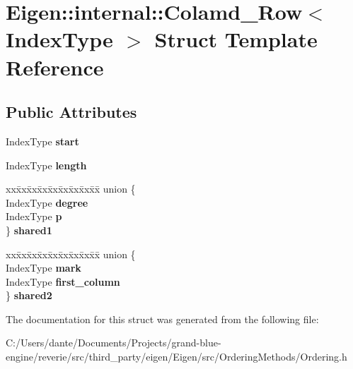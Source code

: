 \hypertarget{struct_eigen_1_1internal_1_1_colamd___row}{}\section{Eigen\+::internal\+::Colamd\+\_\+\+Row$<$ Index\+Type $>$ Struct Template Reference}
\label{struct_eigen_1_1internal_1_1_colamd___row}
\subsection*{Public Attributes}
\begin{DoxyCompactItemize}
\item 
\mbox{\label{struct_eigen_1_1internal_1_1_colamd___row_a41f05e0dd97a417777b381619fedc697}} 
Index\+Type {\bfseries start}
\item 
\mbox{\label{struct_eigen_1_1internal_1_1_colamd___row_adc72231f189d3b0d648e400e48a72173}} 
Index\+Type {\bfseries length}
\item 
\mbox{\label{struct_eigen_1_1internal_1_1_colamd___row_ad3a19f7ad6f75b55e734cd8d404c87c7}} 
\begin{tabbing}
xx\=xx\=xx\=xx\=xx\=xx\=xx\=xx\=xx\=\kill
union \{\\
\>IndexType {\bfseries degree}\\
\>IndexType {\bfseries p}\\
\} {\bfseries shared1}\\

\end{tabbing}\item 
\mbox{\label{struct_eigen_1_1internal_1_1_colamd___row_a384851b7636ce1a734483da4a014ff9b}} 
\begin{tabbing}
xx\=xx\=xx\=xx\=xx\=xx\=xx\=xx\=xx\=\kill
union \{\\
\>IndexType {\bfseries mark}\\
\>IndexType {\bfseries first\_column}\\
\} {\bfseries shared2}\\

\end{tabbing}\end{DoxyCompactItemize}


The documentation for this struct was generated from the following file\+:\begin{DoxyCompactItemize}
\item 
C\+:/\+Users/dante/\+Documents/\+Projects/grand-\/blue-\/engine/reverie/src/third\+\_\+party/eigen/\+Eigen/src/\+Ordering\+Methods/Ordering.\+h\end{DoxyCompactItemize}
